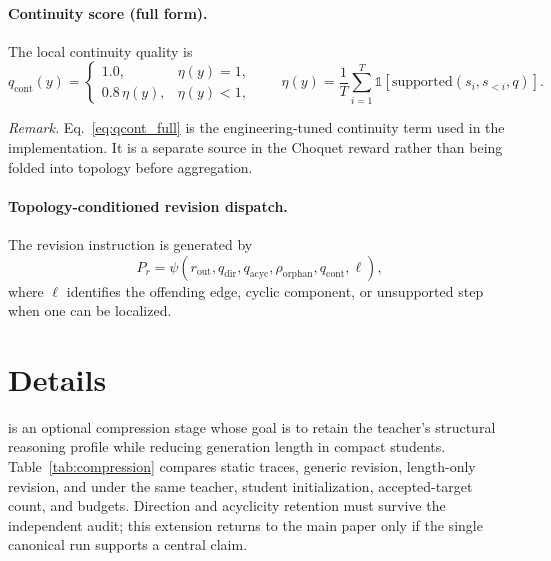 \paragraph{Continuity score (full form).}
The local continuity quality is
\begin{equation}
\label{eq:qcont_full}
q_{\mathrm{cont}}(y)=
\begin{cases}
1.0, & \eta(y)=1,\\
0.8\,\eta(y), & \eta(y)<1,
\end{cases}
\qquad
\eta(y)=\frac{1}{T}\sum_{i=1}^{T}\mathbb{1}[\mathrm{supported}(s_i,s_{<i},q)].
\end{equation}

\noindent\textit{Remark.} Eq.~\eqref{eq:qcont_full} is the engineering-tuned continuity term used in the implementation. It is a separate source in the Choquet reward rather than being folded into topology before aggregation.

\paragraph{Topology-conditioned revision dispatch.}
The revision instruction is generated by
\begin{equation}
\label{eq:topo_pr}
P_r=\psi(r_{\mathrm{out}},q_{\mathrm{dir}},q_{\mathrm{acyc}},
\rho_{\mathrm{orphan}},q_{\mathrm{cont}},\ell),
\end{equation}
where $\ell$ identifies the offending edge, cyclic component, or unsupported step when one can be localized.

\section{\framework Details}
\label{appx:distillation_details}

\framework is an optional compression stage whose goal is to retain the teacher's structural reasoning profile while reducing generation length in compact students.
Table~\ref{tab:compression} compares static traces, generic revision, length-only revision, and \framework under the same teacher, student initialization, accepted-target count, and budgets. Direction and acyclicity retention must survive the independent audit; this extension returns to the main paper only if the single canonical run supports a central claim.

